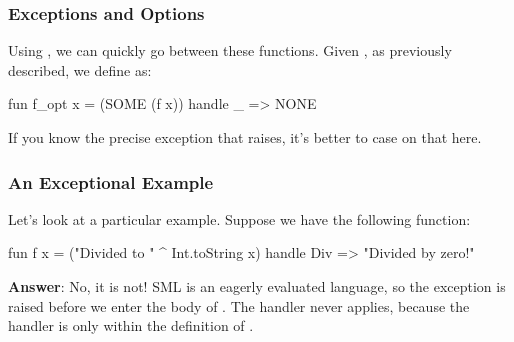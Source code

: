 \documentclass[aspectratio=169, handout]{beamer}
\begin{document}
\begin{frame}[fragile]
  \frametitle{Exceptions and Options}

  Using , we can quickly go between these functions. Given
  , as previously described, we define  as:
  \begin{codeblock}
    fun f_opt x = (SOME (f x)) handle _ => NONE
  \end{codeblock}

  \pause
  \vspace{\fill}


  \pause
  \vspace{\fill}


  \pause
  \vspace{\fill}

  If you know the precise exception that  raises, it's better to case on
  that here.
\end{frame}

\begin{frame}[fragile]
  \frametitle{An Exceptional Example}

  Let's look at a particular example. Suppose we have the following function:

  \pause
  \vspace{\fill}

  \begin{codeblock}
    fun f x =
      ("Divided to " ^ Int.toString x)
      handle Div => "Divided by zero!"
  \end{codeblock}

  \pause
  \vspace{\fill}


  \pause
  \vspace{\fill}

  \textbf{Answer}: No, it is not! SML is an eagerly evaluated language, so the exception 
  is raised before we enter the body of . The handler never applies, because the handler is
  only within the definition of .
\end{frame}
\end{document}
